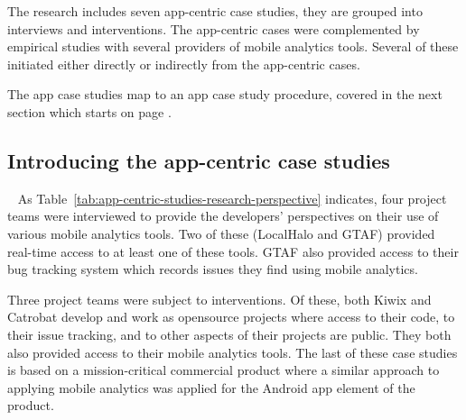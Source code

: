 The research includes seven app-centric case studies, they are grouped into interviews and interventions. The app-centric cases were complemented by empirical studies with several providers of mobile analytics tools. Several of these initiated either directly or indirectly from the app-centric cases. 


The app case studies map to an app case study procedure, covered in the next section which starts on page \pageref{methodology-app-centric-case-study-procedure}. 

\subsection{Introducing the app-centric case studies}~\label{methodology-introducing-the-app-centric-case-studies-section}
As Table~\ref{tab:app-centric-studies-research-perspective} indicates, four project teams were interviewed to provide the developers' perspectives on their use of various mobile analytics tools. Two of these (LocalHalo and GTAF) provided real-time access to at least one of these tools. GTAF also provided access to their bug tracking system which records issues they find using mobile analytics.

Three project teams were subject to interventions. Of these, both Kiwix and Catrobat develop and work as opensource projects where access to their code, to their issue tracking, and to other aspects of their projects are public. They both also provided access to their mobile analytics tools. The last of these case studies is based on a mission-critical commercial product where a similar approach to applying mobile analytics was applied for the Android app element of the product.

